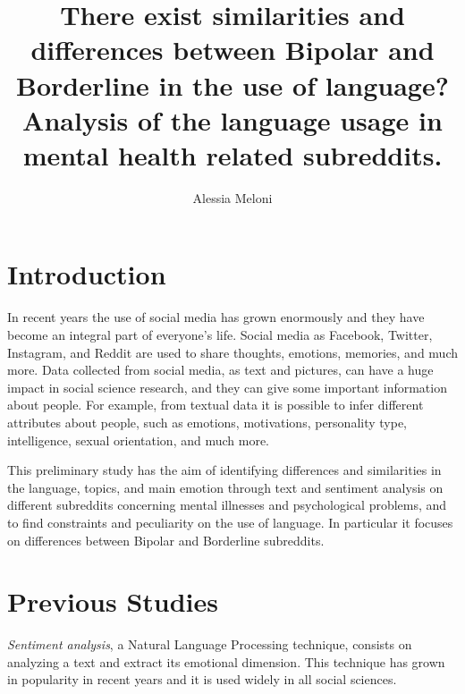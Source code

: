 \documentclass{article}
\begin{document}
	
\title{There exist similarities and differences between Bipolar and Borderline in the use of language? Analysis of the language usage in mental health related subreddits.}
\author{Alessia Meloni}
\date{}
\maketitle

\section{Introduction}	

In recent years the use of social media has grown enormously and they have become an integral part of everyone's life.
Social media as Facebook, Twitter, Instagram, and Reddit are used to share thoughts, emotions, memories, and much more.
Data collected from social media, as text and pictures, can have a huge impact in social science research, and they can give some important information about people.
For example, from textual data it is possible to infer different attributes about people, such as emotions, motivations, personality type, intelligence, sexual orientation, and much more.




This preliminary study has the aim of identifying differences and similarities in the language, topics, and main emotion through text and sentiment analysis on different subreddits concerning mental illnesses and psychological problems, and to find constraints and peculiarity on the use of language. In particular it focuses on differences between Bipolar and Borderline subreddits.









\section{Previous Studies}
\emph{Sentiment analysis}, a Natural Language Processing technique, consists on analyzing a text and extract its emotional dimension. This technique has grown in popularity in recent years and it is used widely in all social sciences. 
\end{document}
